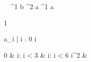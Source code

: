 \begin{eqcode}{\mu}{\ }{\ }{^1}
  b ^2 \lend
  a \in {}^1 \lend
  a \gets 
  \begin{tmatrix}
    1   \lend
  \end{tmatrix} \lend
   \lend  %
  a_i | i : 0 \leq i  \gets
  \begin{cases}
    0 & i: i < 3  & i: i < 6 \lend
    i^2 & \otherwise \lend
  \end{cases}\lend
   \lend %
   \lend
\end{eqcode}
